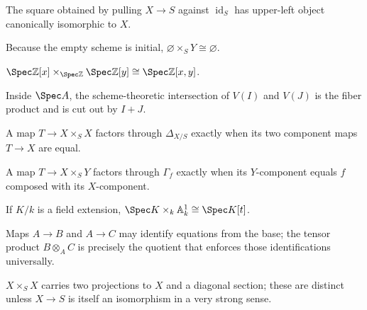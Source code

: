 \begin{example}\label{ex:vi23-r10}
The square obtained by pulling $X\to S$ against $\operatorname{id}_S$ has upper-left object canonically isomorphic to $X$.
\end{example}

\begin{example}\label{ex:vi23-r11}
Because the empty scheme is initial, $\varnothing\times_SY\cong\varnothing$.
\end{example}

\begin{example}\label{ex:vi23-r12}
$\Spec\mathbb Z[x]\times_{\Spec\mathbb Z}\Spec\mathbb Z[y]\cong\Spec\mathbb Z[x,y]$.
\end{example}

\begin{example}\label{ex:vi23-r13}
Inside $\Spec A$, the scheme-theoretic intersection of $V(I)$ and $V(J)$ is the fiber product and is cut out by $I+J$.
\end{example}

\begin{example}\label{ex:vi23-r14}
A map $T\to X\times_SX$ factors through $\Delta_{X/S}$ exactly when its two component maps $T\to X$ are equal.
\end{example}

\begin{example}\label{ex:vi23-r15}
A map $T\to X\times_SY$ factors through $\Gamma_f$ exactly when its $Y$-component equals $f$ composed with its $X$-component.
\end{example}

\begin{example}\label{ex:vi23-r16}
If $K/k$ is a field extension, $\Spec K\times_k\mathbb A^1_k\cong\Spec K[t]$.
\end{example}

\begin{example}\label{ex:vi23-r17}
Maps $A\to B$ and $A\to C$ may identify equations from the base; the tensor product $B\otimes_AC$ is precisely the quotient that enforces those identifications universally.
\end{example}

\begin{example}\label{ex:vi23-r18}
$X\times_SX$ carries two projections to $X$ and a diagonal section; these are distinct unless $X\to S$ is itself an isomorphism in a very strong sense.
\end{example}

